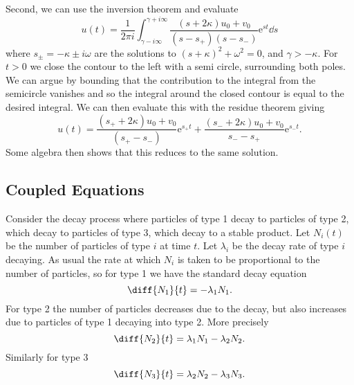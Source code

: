 \documentclass[fleqn]{NotesClass}
\newcommand*{\e}{\mathrm{e}}
\begin{document}
    Second, we can use the inversion theorem and evaluate
    \begin{equation}
        u(t) = \frac{1}{2\pi i} \int_{\gamma - i\infty}^{\gamma + i\infty} \frac{(s + 2\kappa)u_0 + v_0}{(s - s_{+})(s - s_{-})} \e^{st} \dd{s}
    \end{equation}
    where \(s_{\pm} = -\kappa \pm i\omega\) are the solutions to \((s + \kappa)^2 + \omega^2 = 0\), and \(\gamma > - \kappa\).
    For \(t > 0\) we close the contour to the left with a semi circle, surrounding both poles.
    We can argue by bounding that the contribution to the integral from the semicircle vanishes and so the integral around the closed contour is equal to the desired integral.
    We can then evaluate this with the residue theorem giving
    \begin{equation}
        u(t) = \frac{(s_{+} + 2\kappa)u_0 + v_0}{(s_{+} - s_{-})}\e^{s_{+}t} + \frac{(s_{-} + 2\kappa)u_0 + v_0}{s_{-} - s_{+}}\e^{s_{-}t}.
    \end{equation}
    Some algebra then shows that this reduces to the same solution.
    
    \subsection{Coupled Equations}
    Consider the decay process where particles of type 1 decay to particles of type 2, which decay to particles of type 3, which decay to a stable product.
    Let \(N_i(t)\) be the number of particles of type \(i\) at time \(t\).
    Let \(\lambda_i\) be the decay rate of type \(i\) decaying.
    As usual the rate at which \(N_i\) is taken to be proportional to the number of particles, so for type 1 we have the standard decay equation
    \begin{equation}
        \diff{N_1}{t} = -\lambda_1 N_1.
    \end{equation}
    For type 2 the number of particles decreases due to the decay, but also increases due to particles of type 1 decaying into type 2.
    More precisely
    \begin{equation}
        \diff{N_2}{t} = \lambda_1N_1 - \lambda_2N_2.
    \end{equation}
    Similarly for type 3
    \begin{equation}
        \diff{N_3}{t} = \lambda_2N_2 - \lambda_3N_3.
    \end{equation}
    
\end{document}
